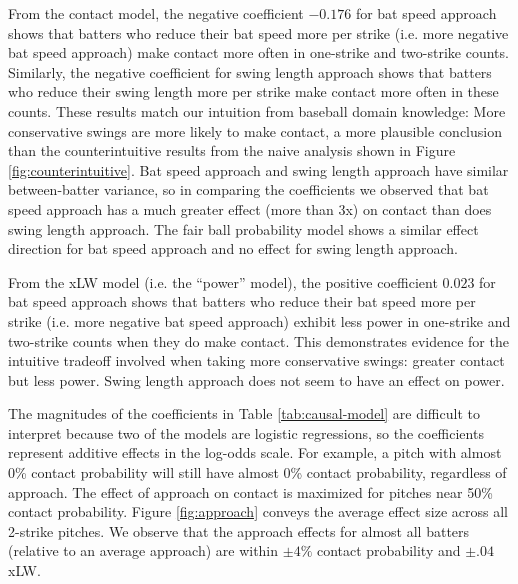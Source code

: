 \documentclass[
  12pt]{article}
\begin{document}
      From the contact model, the negative coefficient $-0.176$ for bat speed approach shows that batters who reduce their bat speed more per strike (i.e. more negative bat speed approach) make contact more often in one-strike and two-strike counts. Similarly, the negative coefficient for swing length approach shows that batters who reduce their swing length more per strike make contact more often in these counts. These results match our intuition from baseball domain knowledge: More conservative swings are more likely to make contact, a more plausible conclusion than the counterintuitive results from the naive analysis shown in Figure \ref{fig:counterintuitive}. Bat speed approach and swing length approach have similar between-batter variance, so in comparing the coefficients we observed that bat speed approach has a much greater effect (more than 3x) on contact than does swing length approach. The fair ball probability model shows a similar effect direction for bat speed approach and no effect for swing length approach.

      From the xLW model (i.e. the ``power'' model), the positive coefficient $0.023$ for bat speed approach shows that batters who reduce their bat speed more per strike (i.e. more negative bat speed approach) exhibit less power in one-strike and two-strike counts when they do make contact. This demonstrates evidence for the intuitive tradeoff involved when taking more conservative swings: greater contact but less power. Swing length approach does not seem to have an effect on power.

      The magnitudes of the coefficients in Table \ref{tab:causal-model} are difficult to interpret because two of the models are logistic regressions, so the coefficients represent additive effects in the log-odds scale. For example, a pitch with almost 0\% contact probability will still have almost 0\% contact probability, regardless of approach. The effect of approach on contact is maximized for pitches near 50\% contact probability. Figure \ref{fig:approach} conveys the average effect size across all 2-strike pitches. We observe that the approach effects for almost all batters (relative to an average approach) are within $\pm4\%$ contact probability and $\pm.04$ xLW.
\end{document}

